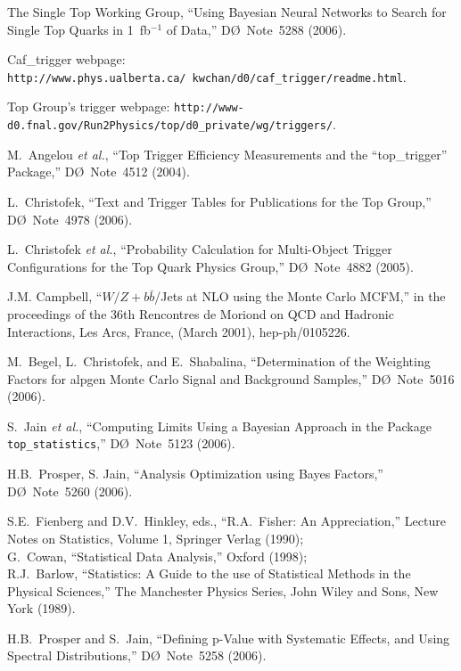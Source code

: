 \documentclass[aps]{revtex4}
\newcommand{\dzero}     {D\O}
\newcommand{\bbbar}     {\mbox{$b\bar{b}$}}
\begin{document}
\begin{thebibliography}{99.}
The Single Top Working Group,
``Using Bayesian Neural Networks to Search for Single Top Quarks in
1~fb$^{-1}$ of Data,''
{\dzero}~Note~5288 (2006).

Caf\_trigger webpage:
\texttt{http://www.phys.ualberta.ca/~kwchan/d0/caf\_trigger/readme.html}.

Top Group's trigger webpage:
\texttt{http://www-d0.fnal.gov/Run2Physics/top/d0\_private/wg/triggers/}.

M.~Angelou {\it et al.},
``Top Trigger Efficiency Measurements and the ``top\_trigger''
Package,''
{\dzero}~Note~4512 (2004).

L.~Christofek,
``Text and Trigger Tables for Publications for the Top Group,''
{\dzero}~Note~4978 (2006).

L.~Christofek {\it et al.},
``Probability Calculation for Multi-Object Trigger Configurations
for the Top Quark Physics Group,''
{\dzero}~Note~4882 (2005).

J.M. Campbell,
``$W/Z+{\bbbar}$/Jets at NLO using the Monte Carlo MCFM,''
in the proceedings of the 36th Rencontres de Moriond on QCD and
Hadronic Interactions, Les Arcs, France, (March 2001), hep-ph/0105226.

M.~Begel, L.~Christofek, and E.~Shabalina,
``Determination of the Weighting Factors for {\sc alpgen} Monte
Carlo Signal and Background Samples,''
{\dzero}~Note~5016 (2006).

S.~Jain {\it et al.},
``Computing Limits Using a Bayesian Approach in the Package
\texttt{top\_statistics},''
{\dzero}~Note~5123 (2006).

H.B.~Prosper, S. Jain,
``Analysis Optimization using Bayes Factors,''
{\dzero}~Note~5260 (2006).

S.E.~Fienberg and D.V.~Hinkley, eds.,
``R.A.~Fisher: An Appreciation,''
Lecture Notes on Statistics, Volume 1, Springer Verlag (1990);\\
G.~Cowan,
``Statistical Data Analysis,''
Oxford (1998);\\
R.J.~Barlow,
``Statistics: A Guide to the use of Statistical Methods in the
Physical Sciences,''
The Manchester Physics Series, John Wiley and Sons, New York (1989).

H.B.~Prosper and S.~Jain,
``Defining p-Value with Systematic Effects, and Using Spectral
Distributions,''
{\dzero}~Note~5258 (2006).

\end{thebibliography}

\end{document}
